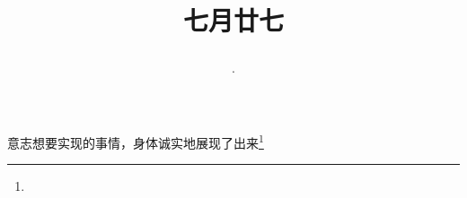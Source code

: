 \title{\date[d=30,m=8,y=2024][year:cn-y,年,month:cn,day:cn,日,·,weekday]·七月廿七 }
意志想要实现的事情，身体诚实地展现了出来\footnote{ }

